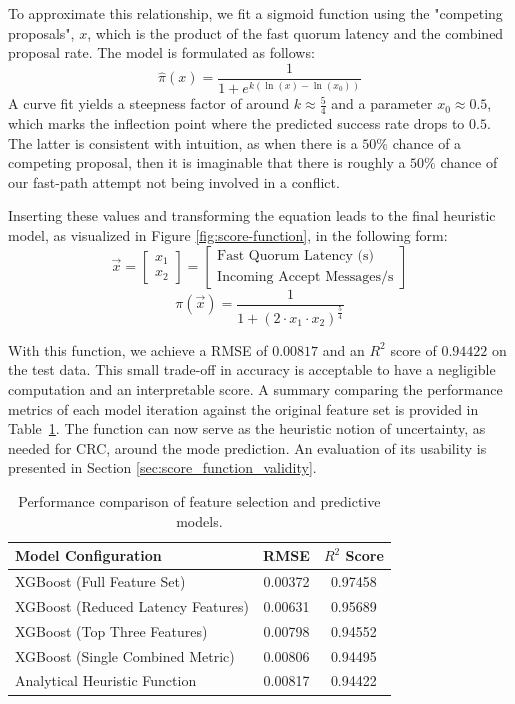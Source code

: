 To approximate this relationship, we fit a sigmoid function using the "competing proposals", $x$, which is the product of the fast quorum latency and the combined proposal rate. The model is formulated as follows:
$$\hat{\pi}(x) = \frac{1}{1 + e^{k(\ln(x) - \ln(x_0))}}$$
A curve fit yields a steepness factor of around $k \approx \frac{5}{4}$ and a parameter $x_0 \approx 0.5$, which marks the inflection point where the predicted success rate drops to $0.5$. The latter is consistent with intuition, as when there is a $50\%$ chance of a competing proposal, then it is imaginable that there is roughly a $50\%$ chance of our fast-path attempt not being involved in a conflict.

Inserting these values and transforming the equation leads to the final heuristic model, as visualized in Figure \ref{fig:score-function}, in the following form:
$$\vec{x} = \begin{bmatrix} x_1 \\ x_2 \end{bmatrix} = \begin{bmatrix} \text{Fast Quorum Latency (s)} \\ \text{Incoming Accept Messages/s} \end{bmatrix}$$
$$\pi(\vec{x}) = \frac{1}{1 + (2 \cdot x_1 \cdot x_2)^{\frac{5}{4}}}$$

With this function, we achieve a \gls{RMSE} of $0.00817$ and an $R^2$ score of $0.94422$ on the test data. This small trade-off in accuracy is acceptable to have a negligible computation and an interpretable score. A summary comparing the performance metrics of each model iteration against the original feature set is provided in Table~\ref{tab:model-performance-comparison}. The function can now serve as the heuristic notion of uncertainty, as needed for \gls{CRC}, around the mode prediction. An evaluation of its usability is presented in Section \ref{sec:score_function_validity}.

\begin{table}[t]
\centering
\renewcommand{\arraystretch}{1.2}
\begin{tabular}{lcc}
\toprule
\textbf{Model Configuration} & \textbf{RMSE} & \textbf{$R^2$ Score} \\
\midrule
XGBoost (Full Feature Set) & 0.00372 & 0.97458 \\
XGBoost (Reduced Latency Features) & 0.00631 & 0.95689 \\
XGBoost (Top Three Features) & 0.00798 & 0.94552 \\
XGBoost (Single Combined Metric) & 0.00806 & 0.94495 \\
Analytical Heuristic Function & 0.00817 & 0.94422 \\ 
\bottomrule
\end{tabular}
\caption{Performance comparison of feature selection and predictive models.}
\label{tab:model-performance-comparison}
\end{table}


